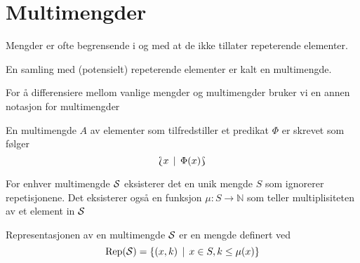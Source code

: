 \section{Multimengder}

Mengder er ofte begrensende i og med at de ikke tillater
repeterende elementer.

\begin{definisjon}\label{def:MultMengde}
  En samling med (potensielt) repeterende elementer er
  kalt en multimengde. 
\end{definisjon}

For å differensiere mellom vanlige mengder og multimengder
bruker vi en annen notasjon for multimengder

\begin{definisjon}\label{def:Mult_Notasjon}
    En multimengde $A$ av elementer som tilfredstiller et
    predikat $\Phi$ er skrevet som følger
    \[\Lbag x\,\mid\, \Phi(x)\Rbag\]
\end{definisjon}

\begin{definisjon}\label{def:Mult_Under}
  For enhver multimengde $\mathcal{S}$ eksisterer det en unik
  mengde $S$ som ignorerer repetisjonene. Det eksisterer
  også en funksjon $\mu: S\to\mathbb{N}$ som teller
  multiplisiteten av et element in $\mathcal{S}$
\end{definisjon}

\begin{definisjon}\label{def:Rep}
   Representasjonen av en multimengde $\mathcal{S}$ er en mengde
   definert ved
   \[\textnormal{Rep}(\mathcal{S}) = \left\{(x,k)\,\mid\,x\in S, k\leq \mu(x)\right\}\]
\end{definisjon}


